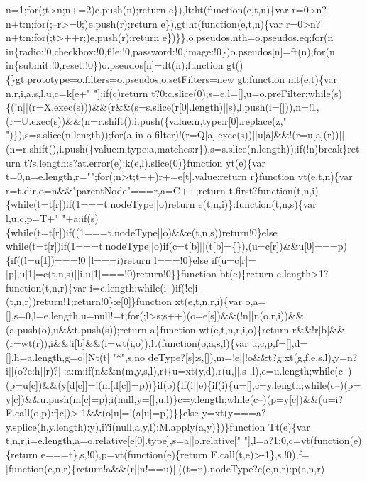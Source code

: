 \begin{DoxyCode}
{       n=1;for(;t>n;n+=2)e.push(n);return e\}),lt:ht(function(e,t,n)\{var r=0>n?n+t:n;for(;--r>=0;)e.push(r);return
       e\}),gt:ht(function(e,t,n)\{var r=0>n?n+t:n;for(;t>++r;)e.push(r);return e\})\}\},o.pseudos.nth=o.pseudos.eq;for(n
       in\{radio:!0,checkbox:!0,file:!0,password:!0,image:!0\})o.pseudos[n]=ft(n);for(n
       in\{submit:!0,reset:!0\})o.pseudos[n]=dt(n);function gt()\{\}gt.prototype=o.filters=o.pseudos,o.setFilters=new gt;function mt(e,t)\{var
       n,r,i,a,s,l,u,c=k[e+" "];if(c)return
       t?0:c.slice(0);s=e,l=[],u=o.preFilter;while(s)\{(!n||(r=X.exec(s)))&&(r&&(s=s.slice(r[0].length)||s),l.push(i=[])),n=!1,(r=U.exec(s))&&(n=r.shift(),i.push(\{value:n,type:r[0].replace(z,"
       ")\}),s=s.slice(n.length));for(a in
       o.filter)!(r=Q[a].exec(s))||u[a]&&!(r=u[a](r))||(n=r.shift(),i.push(\{value:n,type:a,matches:r\}),s=s.slice(n.length));if(!n)break\}return t?s.length:s?at.error(e):k(e,l).slice(0)\}function
       yt(e)\{var t=0,n=e.length,r="";for(;n>t;t++)r+=e[t].value;return r\}function vt(e,t,n)\{var
       r=t.dir,o=n&&"parentNode"===r,a=C++;return t.first?function(t,n,i)\{while(t=t[r])if(1===t.nodeType||o)return
       e(t,n,i)\}:function(t,n,s)\{var l,u,c,p=T+" "+a;if(s)\{while(t=t[r])if((1===t.nodeType||o)&&e(t,n,s))return!0\}else
       while(t=t[r])if(1===t.nodeType||o)if(c=t[b]||(t[b]=\{\}),(u=c[r])&&u[0]===p)\{if((l=u[1])===!0||l===i)return l===!0\}else
       if(u=c[r]=[p],u[1]=e(t,n,s)||i,u[1]===!0)return!0\}\}function bt(e)\{return e.length>1?function(t,n,r)\{var
       i=e.length;while(i--)if(!e[i](t,n,r))return!1;return!0\}:e[0]\}function xt(e,t,n,r,i)\{var
       o,a=[],s=0,l=e.length,u=null!=t;for(;l>s;s++)(o=e[s])&&(!n||n(o,r,i))&&(a.push(o),u&&t.push(s));return a\}function wt(e,t,n,r,i,o)\{return
       r&&!r[b]&&(r=wt(r)),i&&!i[b]&&(i=wt(i,o)),lt(function(o,a,s,l)\{var
       u,c,p,f=[],d=[],h=a.length,g=o||Nt(t||"*",s.no
      deType?[s]:s,[]),m=!e||!o&&t?g:xt(g,f,e,s,l),y=n?i||(o?e:h||r)?[]:a:m;if(n&&n(m,y,s,l),r)\{u=xt(y,d),r(u,[],s
      ,l),c=u.length;while(c--)(p=u[c])&&(y[d[c]]=!(m[d[c]]=p))\}if(o)\{if(i||e)\{if(i)\{u=[],c=y.length;while(c--)(p=
      y[c])&&u.push(m[c]=p);i(null,y=[],u,l)\}c=y.length;while(c--)(p=y[c])&&(u=i?F.call(o,p):f[c])>-1&&(o[u]=!(a[u]=p))\}\}else y=xt(y===a?y.splice(h,y.length):y),i?i(null,a,y,l):M.apply(a,y)\})\}function Tt(e)\{var
       t,n,r,i=e.length,a=o.relative[e[0].type],s=a||o.relative[" "],l=a?1:0,c=vt(function(e)\{return
       e===t\},s,!0),p=vt(function(e)\{return
       F.call(t,e)>-1\},s,!0),f=[function(e,n,r)\{return!a&&(r||n!==u)||((t=n).nodeType?c(e,n,r):p(e,n,r)
}
\end{DoxyCode}
